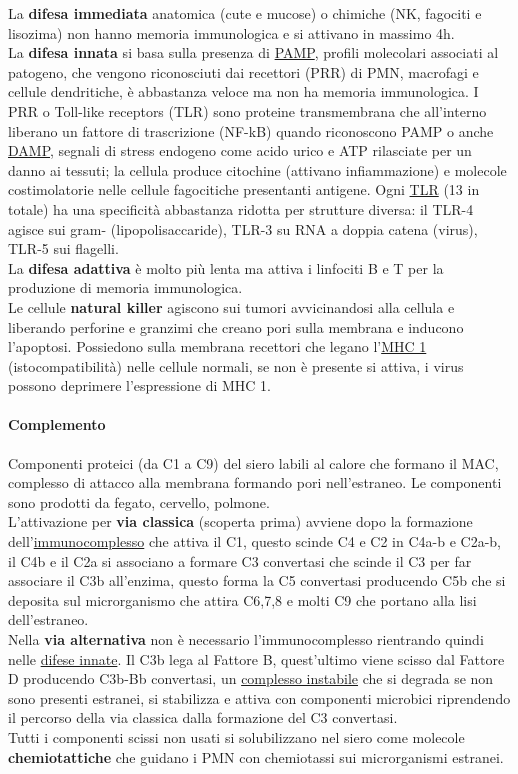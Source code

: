 \documentclass[10pt]{article}
\begin{document}
La \textbf{difesa immediata} anatomica (cute e mucose) o chimiche (NK, fagociti e lisozima) non hanno memoria immunologica e si attivano in massimo 4h.\\
La \textbf{difesa innata} si basa sulla presenza di \underline{PAMP}, profili molecolari associati al patogeno, che vengono riconosciuti dai recettori (PRR) di PMN, macrofagi e cellule dendritiche, è abbastanza veloce ma non ha memoria immunologica. I PRR o Toll-like receptors (TLR) sono proteine transmembrana che all'interno liberano un fattore di trascrizione (NF-kB) quando riconoscono PAMP o anche \underline{DAMP}, segnali di stress endogeno come acido urico e ATP rilasciate per un danno ai tessuti; la cellula produce citochine (attivano infiammazione) e molecole costimolatorie nelle cellule fagocitiche presentanti antigene. Ogni \underline{TLR} (13 in totale) ha una specificità abbastanza ridotta per strutture diversa: il TLR-4 agisce sui gram- (lipopolisaccaride), TLR-3 su RNA a doppia catena (virus), TLR-5 sui flagelli. \\
La \textbf{difesa adattiva} è molto più lenta ma attiva i linfociti B e T per la produzione di memoria immunologica.\\
Le cellule \textbf{natural killer} agiscono sui tumori avvicinandosi alla cellula e liberando perforine e granzimi che creano pori sulla membrana e inducono l'apoptosi. Possiedono sulla membrana recettori che legano l'\underline{MHC 1} (istocompatibilità) nelle cellule normali, se non è presente si attiva, i virus possono deprimere l'espressione di MHC 1.
\paragraph*{Complemento} Componenti proteici (da C1 a C9) del siero labili al calore che formano il MAC, complesso di attacco alla membrana formando pori nell'estraneo. Le componenti sono prodotti da fegato, cervello, polmone. \\
L'attivazione per \textbf{via classica} (scoperta prima) avviene dopo la formazione dell'\underline{immunocomplesso} che attiva il C1, questo scinde C4 e C2 in C4a-b e C2a-b, il C4b e il C2a si associano a formare C3 convertasi che scinde il C3 per far associare il C3b all'enzima, questo forma la C5 convertasi producendo C5b che si deposita sul microrganismo che attira C6,7,8 e molti C9 che portano alla lisi dell'estraneo.\\
Nella \textbf{via alternativa} non è necessario l'immunocomplesso rientrando quindi nelle \underline{difese innate}. Il C3b lega al Fattore B, quest'ultimo viene scisso dal Fattore D producendo C3b-Bb convertasi, un \underline{complesso instabile} che si degrada se non sono presenti estranei, si stabilizza e attiva con componenti microbici riprendendo il percorso della via classica dalla formazione del C3 convertasi.\\
Tutti i componenti scissi non usati si solubilizzano nel siero come molecole \textbf{chemiotattiche} che guidano i PMN con chemiotassi sui microrganismi estranei.
\end{document}
